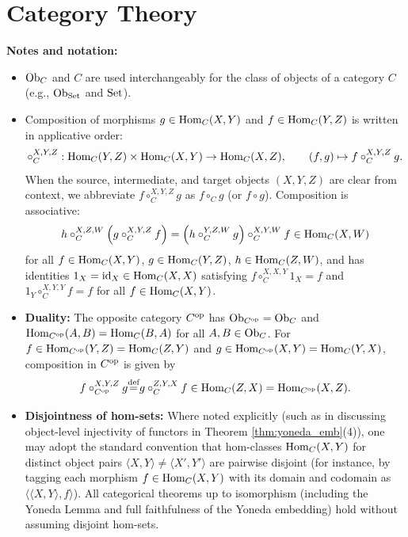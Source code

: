 \documentclass[10pt,a4paper]{article}
\begin{document}
\section{Category Theory}\label{sec:cat_theory}
\noindent\textbf{Notes and notation:}
\begin{itemize}
\item ${\textrm{Ob}}_C$ and $C$ are used interchangeably for the class of objects of a category $C$ (e.g., ${\textrm{Ob}}_{\textrm{Set}}$ and ${\textrm{Set}}$).
\item Composition of morphisms $g \in {\textrm{Hom}}_C(X,Y)$ and $f \in {\textrm{Hom}}_C(Y,Z)$ is written in applicative order:
$$\circ_C^{X,Y,Z} : {\textrm{Hom}}_C(Y,Z) \times {\textrm{Hom}}_C(X,Y) \to {\textrm{Hom}}_C(X,Z), \qquad (f, g) \mapsto f \circ_C^{X,Y,Z} g.$$
When the source, intermediate, and target objects $(X, Y, Z)$ are clear from context, we abbreviate $f \circ_C^{X,Y,Z} g$ as $f \circ_C g$ (or $f \circ g$). Composition is associative:
$$h \circ_C^{X,Z,W} \left(g \circ_C^{X,Y,Z} f\right) = \left(h \circ_C^{Y,Z,W} g\right) \circ_C^{X,Y,W} f \in {\textrm{Hom}}_C(X,W)$$
for all $f \in {\textrm{Hom}}_C(X,Y)$, $g \in {\textrm{Hom}}_C(Y,Z)$, $h \in {\textrm{Hom}}_C(Z,W)$, and has identities $1_X = {\textrm{id}}_X \in {\textrm{Hom}}_C(X,X)$ satisfying $f \circ_C^{X,X,Y} 1_X = f$ and $1_Y \circ_C^{X,Y,Y} f = f$ for all $f \in {\textrm{Hom}}_C(X,Y)$.
\item \textbf{Duality:} The opposite category $C^{\textrm{op}}$ has ${\textrm{Ob}}_{C^{\textrm{op}}} = {\textrm{Ob}}_C$ and ${\textrm{Hom}}_{C^{\textrm{op}}}(A,B) = {\textrm{Hom}}_C(B,A)$ for all $A,B \in {\textrm{Ob}}_C$. For $f \in {\textrm{Hom}}_{C^{\textrm{op}}}(Y,Z) = {\textrm{Hom}}_C(Z,Y)$ and $g \in {\textrm{Hom}}_{C^{\textrm{op}}}(X,Y) = {\textrm{Hom}}_C(Y,X)$, composition in $C^{\textrm{op}}$ is given by
$$f \circ_{C^{\textrm{op}}}^{X,Y,Z} g {\stackrel{{\textrm{def}}}{=}} g \circ_C^{Z,Y,X} f \in {\textrm{Hom}}_C(Z,X) = {\textrm{Hom}}_{C^{\textrm{op}}}(X,Z).$$
\item \textbf{Disjointness of hom-sets:} Where noted explicitly (such as in discussing object-level injectivity of functors in Theorem \ref{thm:yoneda_emb}(4)), one may adopt the standard convention \cite{MacLane1998,Riehl2016} that hom-classes ${\textrm{Hom}}_C(X, Y)$ for distinct object pairs $\langle X, Y \rangle \neq \langle X', Y' \rangle$ are pairwise disjoint (for instance, by tagging each morphism $f \in {\textrm{Hom}}_C(X, Y)$ with its domain and codomain as $\langle \langle X, Y \rangle, f \rangle$). All categorical theorems up to isomorphism (including the Yoneda Lemma and full faithfulness of the Yoneda embedding) hold without assuming disjoint hom-sets.
\end{itemize}
\end{document}
